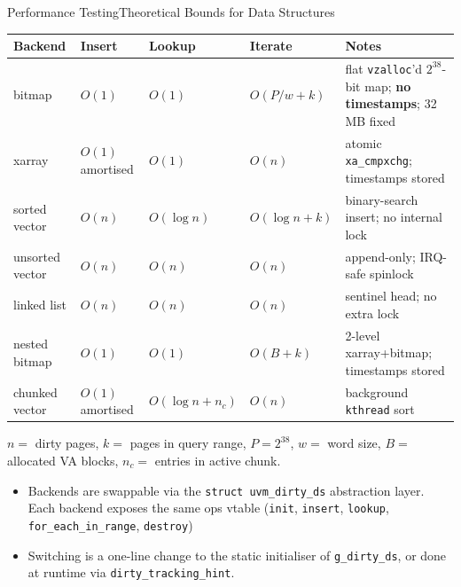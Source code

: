 \begin{frame}{Performance Testing}{Theoretical Bounds for Data Structures}
\begin{center}
\renewcommand{\arraystretch}{1.15}
\scriptsize
\begin{tabular}{l l l l p{52mm}}
\toprule
\textbf{Backend} & \textbf{Insert} & \textbf{Lookup} & \textbf{Iterate} & \textbf{Notes} \\
\midrule
bitmap           & $O(1)$            & $O(1)$       & $O(P/w + k)$  & flat \texttt{vzalloc}'d $2^{38}$-bit map; \textbf{no timestamps}; 32\,MB fixed \\
xarray           & $O(1)$ amortised  & $O(1)$       & $O(n)$        & atomic \texttt{xa\_cmpxchg}; timestamps stored \\
sorted vector    & $O(n)$            & $O(\log n)$  & $O(\log n+k)$ & binary-search insert; no internal lock \\
unsorted vector  & $O(n)$            & $O(n)$       & $O(n)$        & append-only; IRQ-safe spinlock \\
linked list      & $O(n)$            & $O(n)$       & $O(n)$        & sentinel head; no extra lock \\
nested bitmap    & $O(1)$            & $O(1)$       & $O(B+k)$      & 2-level xarray+bitmap; timestamps stored \\
chunked vector   & $O(1)$ amortised  & $O(\log n + n_c)$ & $O(n)$    & background \texttt{kthread} sort \\
\bottomrule
\end{tabular}
\end{center}
\vspace{1mm}
{\scriptsize $n=$ dirty pages, $k=$ pages in query range,
$P=2^{38}$, $w=$ word size, $B=$ allocated VA blocks,
$n_c=$ entries in active chunk.}

\vspace{1.5mm}
{\scriptsize
\begin{itemize}
  \item Backends are swappable via the \texttt{struct uvm\_dirty\_ds} abstraction layer. Each backend exposes the same ops vtable (\texttt{init}, \texttt{insert}, \texttt{lookup},
\texttt{for\_each\_in\_range}, \texttt{destroy})
  \item Switching is a one-line change to the static initialiser of \texttt{g\_dirty\_ds}, or done at runtime via \texttt{dirty\_tracking\_hint}.

\end{itemize}
}
\end{frame}


